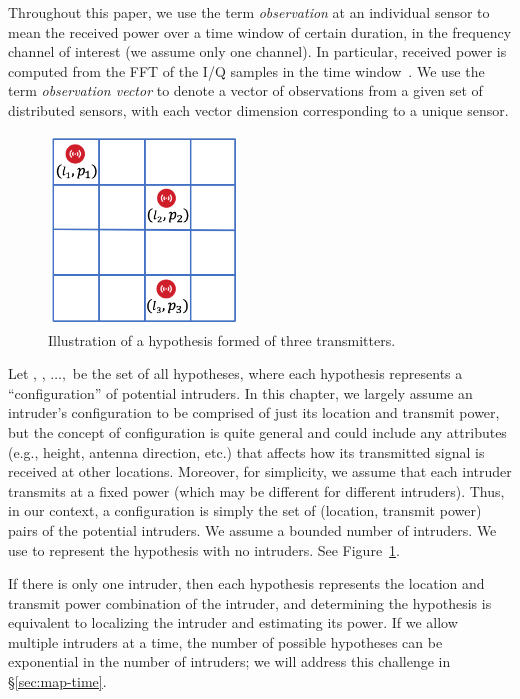 Throughout this
paper, we use the term {\em observation} at an individual sensor to
mean the received power over a time window of certain duration, in the
frequency channel of interest (we assume only one channel). In
particular, received power is computed from the FFT of the I/Q samples
in the time window~\cite{infocom18-spectrum}. We use the term {\em observation
  vector} \vx to denote a vector of observations from a given set of
distributed sensors, with each vector dimension corresponding to a
unique sensor.

\begin{figure}
\includegraphics[width=2in]{chapters/ipsn/figures/hypothesis.png}
\caption{Illustration of a hypothesis formed of three transmitters.}
\label{fig:hypothesis-grid}
\end{figure}
 Let \hz, \ho, $\ldots,$ \hM be the set of all
hypotheses, where each hypothesis \hj represents a ``configuration''
of potential intruders. In this chapter, we largely assume an
  intruder's configuration to be comprised of just its location and
  transmit power, but the concept of configuration is quite general
  and could include any attributes (e.g., height, antenna direction,
  etc.) that affects how its transmitted signal is received at other
  locations. Moreover, for simplicity, we assume that each intruder
  transmits at a fixed power (which may be different for different
  intruders). Thus, in our context, a configuration is simply the set
of (location, transmit power) pairs of the potential intruders. We
assume a bounded number of intruders. We use \hz to represent the
hypothesis with no intruders. See Figure~\ref{fig:hypothesis-grid}.

If there is only one intruder, then each hypothesis represents the
location and transmit power combination of the intruder, and
determining the hypothesis is equivalent to localizing the intruder
and estimating its power. If we allow multiple intruders at a time,
the number of possible hypotheses can be exponential in the number of
intruders; we will address this challenge in
\S\ref{sec:map-time}.

